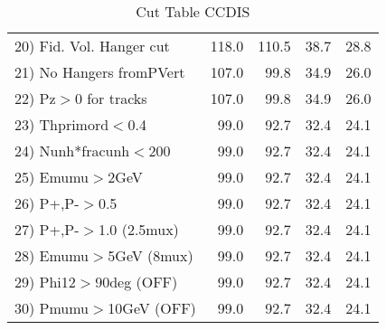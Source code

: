 \begin{table}[h!]
\begin{tabular}{||l||r|r|r|r||}
 20) Fid. Vol. Hanger cut &       118.0 &       110.5 &        38.7 &        28.8 \\
 21) No Hangers fromPVert &       107.0 &        99.8 &        34.9 &        26.0 \\
 22) Pz$>$0 for tracks    &       107.0 &        99.8 &        34.9 &        26.0 \\
 23) Thprimord$<$0.4      &        99.0 &        92.7 &        32.4 &        24.1 \\
 24) Nunh*fracunh$<$200   &        99.0 &        92.7 &        32.4 &        24.1 \\
 25) Emumu$>$2GeV         &        99.0 &        92.7 &        32.4 &        24.1 \\
 26) P+,P-$>$0.5          &        99.0 &        92.7 &        32.4 &        24.1 \\
 27) P+,P-$>$1.0 (2.5mux) &        99.0 &        92.7 &        32.4 &        24.1 \\
 28) Emumu$>$5GeV  (8mux) &        99.0 &        92.7 &        32.4 &        24.1 \\
 29) Phi12$>$90deg  (OFF) &        99.0 &        92.7 &        32.4 &        24.1 \\
 30) Pmumu$>$10GeV  (OFF) &        99.0 &        92.7 &        32.4 &        24.1 \\
 \hline
 \hline
 \end{tabular}
 \caption{Cut Table  CCDIS  }
 \label{tab-cut_ccdis}
 \end{table}
